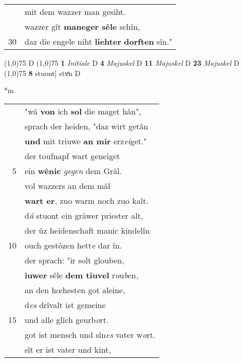 \documentclass[8pt,a4paper,notitlepage]{article}
\begin{document}
\begin{table}[ht]
\begin{minipage}[t]{0.5\linewidth}
\begin{tabular}{rl}
 & mit dem wazzer man gesiht.\\ 
 & wazzer gît \textbf{maneger sêle} schîn,\\ 
30 & daz die engele niht \textbf{liehter} \textbf{dorften} sîn."\\ 
\end{tabular}
\scriptsize
\line(1,0){75} \newline
D \newline
\line(1,0){75} \newline
\textbf{1} \textit{Initiale} D  \textbf{4} \textit{Majuskel} D  \textbf{11} \textit{Majuskel} D  \textbf{23} \textit{Majuskel} D  \newline
\line(1,0){75} \newline
\textbf{8} stuont] stvͦn D \newline
\end{minipage}
\hspace{0.5cm}
\begin{minipage}[t]{0.5\linewidth}
\small
\begin{center}*m
\end{center}
\begin{tabular}{rl}
 & "wâ \textbf{von} ich \textbf{sol} die maget hân",\\ 
 & sprach der heiden, "daz wirt getân\\ 
 & \textbf{und} mit triuwe \textbf{an mir} erz\textit{ei}get."\\ 
 & der toufnapf wart geneiget\\ 
5 & ein \textbf{wênic} \textit{gegen} dem Grâl.\\ 
 & vol wazzers an dem mâl\\ 
 & \textbf{wart er}, zuo warm noch zuo kalt.\\ 
 & d\textit{â} stuont ein grâwer priester alt,\\ 
 & der ûz heidenschaft manic kindelîn\\ 
10 & ouch gestôzen hett\textit{e} dar în.\\ 
 & der sprach: "ir solt glouben,\\ 
 & \textbf{iuwer} sêle \textbf{dem tiuvel} r\textit{o}u\textit{b}en,\\ 
 & an den hœhesten got aleine,\\ 
 & d\textit{es} drîvalt ist gemeine\\ 
15 & und alle glîch geurb\textit{o}rt.\\ 
 & got ist mensch und sîn\textit{es} vater w\textit{o}rt.\\ 
 & sît er ist vater und kint,\\ 

\end{tabular}
\end{minipage}
\end{table}
\end{document}
